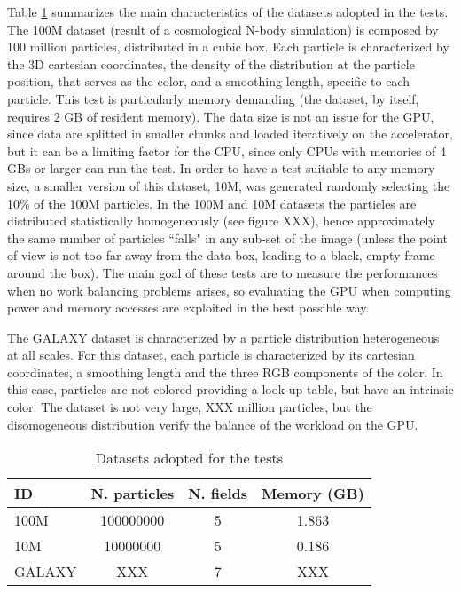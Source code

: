 \documentclass[11pt]{article}
\begin{document}
Table \ref{table:tests} summarizes the main characteristics of the datasets adopted in the 
tests. The 100M dataset (result of a cosmological N-body simulation) 
is composed by 100 million particles, distributed in 
a cubic box. Each particle is characterized by the 3D cartesian coordinates,
the density of the distribution at the particle position, that serves as the color,
and a smoothing length, specific to each particle. This test is particularly 
memory demanding (the dataset, by itself, requires 2 GB 
of resident memory). The data size is not an issue for the GPU, since data are splitted 
in smaller chunks and loaded iteratively on the accelerator, but it can be a limiting factor
for the CPU, since only CPUs with memories of 4 GBs or larger can run the test. 
In order to have a test suitable to any memory size, a smaller version of this dataset, 10M, was generated 
randomly selecting the 10\% of the 100M particles. 
In the 100M and 10M datasets the particles are distributed 
statistically homogeneously (see figure XXX), hence approximately the same 
number of particles ``falls" in any sub-set of the image (unless
the point of view is not too far away from the data box, leading to a black, empty 
frame around the box). The main goal of these tests are to measure the performances
when no work balancing problems arises, so evaluating the GPU when computing 
power and memory accesses are exploited in the best possible way. 

The GALAXY dataset is characterized by a particle distribution 
heterogeneous at all scales. For this dataset, each particle is characterized by its 
cartesian coordinates, a smoothing length and the three RGB components of the color. 
In this case, particles are not colored providing a look-up table,
but have an intrinsic color. The dataset is not very large, XXX million 
particles, but the disomogeneous distribution verify the balance 
of the workload on the GPU.

\begin{table}
\caption{Datasets adopted for the tests}
\centering 
\begin{tabular}{l c c c} 
\hline\hline 
ID & N. particles & N. fields & Memory (GB) \\ [0.5ex] 
\hline %
100M   & 100000000 & 5 & 1.863 \\ 
10M    & 10000000  & 5 & 0.186 \\
GALAXY & XXX & 7 & XXX \\
\hline 
\end{tabular}
\label{table:tests}
\end{table}
\end{document}
